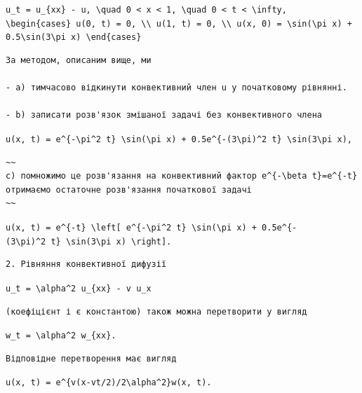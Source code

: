 \documentclass[
  ukrainian,
]{article}
\begin{document}
\texttt{u\_t\ =\ u\_\{xx\}\ -\ u,\ \textbackslash{}quad\ 0\ \textless{}\ x\ \textless{}\ 1,\ \textbackslash{}quad\ 0\ \textless{}\ t\ \textless{}\ \textbackslash{}infty,}
\texttt{\textbackslash{}begin\{cases\}\ u(0,\ t)\ =\ 0,\ \textbackslash{}\textbackslash{}\ u(1,\ t)\ =\ 0,\ \textbackslash{}\textbackslash{}\ u(x,\ 0)\ =\ \textbackslash{}sin(\textbackslash{}pi\ x)\ +\ 0.5\textbackslash{}sin(3\textbackslash{}pi\ x)\ \textbackslash{}end\{cases\}}

\begin{verbatim}
За методом, описаним вище, ми

- a) тимчасово відкинути конвективний член u у початковому рівнянні.

- b) записати розв'язок змішаної задачі без конвективного члена
\end{verbatim}

\texttt{u(x,\ t)\ =\ e\^{}\{-\textbackslash{}pi\^{}2\ t\}\ \textbackslash{}sin(\textbackslash{}pi\ x)\ +\ 0.5e\^{}\{-(3\textbackslash{}pi)\^{}2\ t\}\ \textbackslash{}sin(3\textbackslash{}pi\ x),}

\begin{verbatim}
~~
c) помножимо це розв'язання на конвективний фактор e^{-\beta t}=e^{-t} отримаємо остаточне розв'язання початкової задачі
~~
\end{verbatim}

\texttt{u(x,\ t)\ =\ e\^{}\{-t\}\ \textbackslash{}left{[}\ e\^{}\{-\textbackslash{}pi\^{}2\ t\}\ \textbackslash{}sin(\textbackslash{}pi\ x)\ +\ 0.5e\^{}\{-(3\textbackslash{}pi)\^{}2\ t\}\ \textbackslash{}sin(3\textbackslash{}pi\ x)\ \textbackslash{}right{]}.}

\begin{verbatim}
2. Рівняння конвективної дифузії
\end{verbatim}

\texttt{u\_t\ =\ \textbackslash{}alpha\^{}2\ u\_\{xx\}\ -\ v\ u\_x}

\begin{verbatim}
(коефіцієнт і є константою) також можна перетворити у вигляд
\end{verbatim}

\texttt{w\_t\ =\ \textbackslash{}alpha\^{}2\ w\_\{xx\}.}

\begin{verbatim}
Відповідне перетворення має вигляд
\end{verbatim}

\texttt{u(x,\ t)\ =\ e\^{}\{v(x-vt/2)/2\textbackslash{}alpha\^{}2\}w(x,\ t).}
\end{document}
